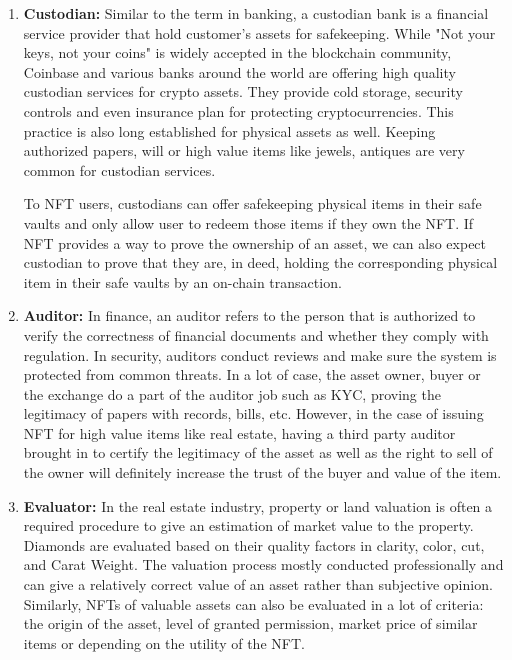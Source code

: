 \documentclass[12pt]{article}
\begin{document}
\begin{enumerate}
    \item \textbf{Custodian:} Similar to the term in banking, a custodian bank is a financial service provider that hold customer's assets for safekeeping. While "Not your keys, not your coins" is widely accepted in the blockchain community, Coinbase and various banks around the world are offering high quality custodian services for crypto assets. They provide cold storage, security controls and even insurance plan for protecting cryptocurrencies. This practice is also long established for physical assets as well. Keeping authorized papers, will or high value items like jewels, antiques are very common for custodian services.
    
    To NFT users, custodians can offer safekeeping physical items in their safe vaults and only allow user to redeem those items if they own the NFT. If NFT provides a way to prove the ownership of an asset, we can also expect custodian to prove that they are, in deed, holding the corresponding physical item in their safe vaults by an on-chain transaction.
    
    \item \textbf{Auditor:} In finance, an auditor refers to the person that is authorized to verify the correctness of financial documents and whether they comply with regulation. In security, auditors conduct reviews and make sure the system is protected from common threats. In a lot of case, the asset owner, buyer or the exchange do a part of the auditor job such as KYC, proving the legitimacy of papers with records, bills, etc. However, in the case of issuing NFT for high value items like real estate, having a third party auditor brought in to certify the legitimacy of the asset as well as the right to sell of the owner will definitely increase the trust of the buyer and value of the item.
    
    \item \textbf{Evaluator:} In the real estate industry, property or land valuation is often a required procedure to give an estimation of market value to the property. Diamonds are evaluated based on their quality factors in clarity, color, cut, and Carat Weight. The valuation process mostly conducted professionally and can give a relatively correct value of an asset rather than subjective opinion. Similarly, NFTs of valuable assets can also be evaluated in a lot of criteria: the origin of the asset, level of granted permission, market price of similar items or depending on the utility of the NFT.
    

\end{enumerate}
\end{document}
